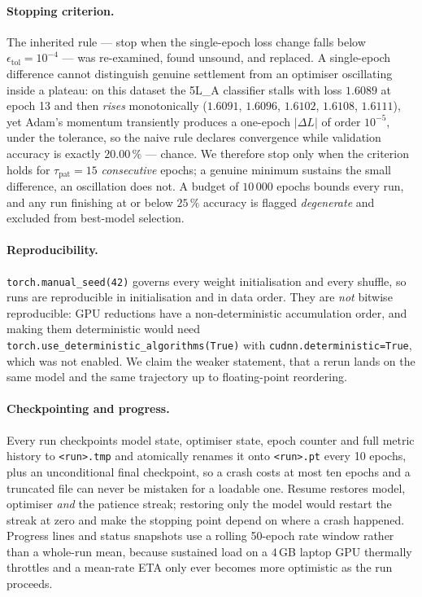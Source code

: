 \documentclass[11pt,a4paper]{article}
\newcommand{\code}[1]{\texttt{#1}}
\begin{document}
\paragraph{Stopping criterion.}
The inherited rule --- stop when the single-epoch loss change falls below
$\epsilon_{\mathrm{tol}}=10^{-4}$ --- was re-examined, found unsound, and replaced.  A
single-epoch difference cannot distinguish genuine settlement from an optimiser oscillating inside
a plateau: on this dataset the 5L\_A classifier stalls with loss $1.6089$ at epoch 13 and then
\emph{rises} monotonically ($1.6091$, $1.6096$, $1.6102$, $1.6108$, $1.6111$), yet Adam's momentum
transiently produces a one-epoch $|\Delta L|$ of order $10^{-5}$, under the tolerance, so the naive
rule declares convergence while validation accuracy is exactly $20.00\,\%$ --- chance.  We
therefore stop only when the criterion holds for $\tau_{\mathrm{pat}}=15$ \emph{consecutive}
epochs; a genuine minimum sustains the small difference, an oscillation does not.  A budget of
$10\,000$ epochs bounds every run, and any run finishing at or below $25\,\%$ accuracy is flagged
\emph{degenerate} and excluded from best-model selection.

\paragraph{Reproducibility.}
\code{torch.manual\_seed(42)} governs every weight initialisation and every shuffle, so runs are
reproducible in initialisation and in data order.  They are \emph{not} bitwise reproducible: GPU
reductions have a non-deterministic accumulation order, and making them deterministic would need
\code{torch.use\_deterministic\_algorithms(True)} with \code{cudnn.deterministic=True}, which was
not enabled.  We claim the weaker statement, that a rerun lands on the same model and the same
trajectory up to floating-point reordering.

\paragraph{Checkpointing and progress.}
Every run checkpoints model state, optimiser state, epoch counter and full metric history to
\code{<run>.tmp} and atomically renames it onto \code{<run>.pt} every 10 epochs, plus an
unconditional final checkpoint, so a crash costs at most ten epochs and a truncated file can never
be mistaken for a loadable one.  Resume restores model, optimiser \emph{and} the patience streak;
restoring only the model would restart the streak at zero and make the stopping point depend on
where a crash happened.  Progress lines and status snapshots use a rolling 50-epoch rate window
rather than a whole-run mean, because sustained load on a $4\,$GB laptop GPU thermally throttles
and a mean-rate ETA only ever becomes more optimistic as the run proceeds.
\end{document}

